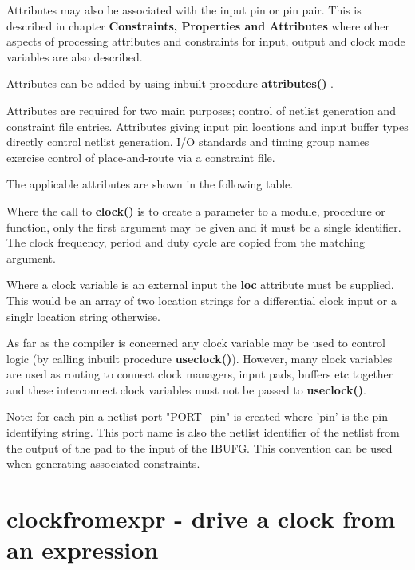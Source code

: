         Attributes may also be associated with the input pin or pin pair. This is
        described in chapter  {\bf Constraints, Properties and
        Attributes} where other aspects of processing attributes and constraints
        for input, output and clock mode variables are also described.

        Attributes can be added by using inbuilt procedure {\bf attributes()}
        .             
        
        Attributes are required for two main purposes; control of netlist
        generation and constraint file entries. Attributes giving input pin
        locations and input buffer types directly control netlist generation.
        I/O standards and timing group names exercise control of place-and-route
        via a constraint file.
              
        The applicable attributes are shown in the following table.

        
                
        Where the call to {\bf clock()} is to create a parameter to a module,
        procedure or function, only the first argument may be given and it must be
        a single identifier. The clock frequency, period and duty cycle are
        copied from the matching argument.
        
        Where a clock variable is an external input the {\bf loc} attribute
        must be supplied. This would be an array of two location strings for
        a differential clock input or a singlr location string otherwise.

        As far as the compiler is concerned any clock variable may be used to
        control logic (by calling inbuilt procedure {\bf useclock()}). However,
        many clock variables are used as routing to connect clock managers,
        input pads, buffers etc together and these interconnect clock variables
        must not be passed to {\bf useclock()}.
       
        Note: for each pin a netlist port "PORT\_pin" is created where 'pin' is
        the pin identifying string. This port name is also the netlist identifier
        of the netlist from the output of the pad to the input of the IBUFG.
        This convention can be used when generating associated constraints.



    \section{clockfromexpr - drive a clock from an expression}\label{sec:ipclockfromexpr}

